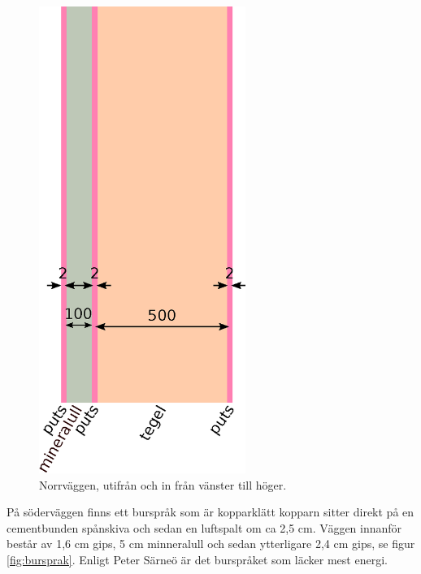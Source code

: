 \begin{figure}[hpbt]
\centering
\includegraphics[width=0.6\textwidth]{../images/norrvagg.eps}
\caption{\label{fig:sodervagg}{Norrväggen, utifrån och in från vänster till höger.}}
\end{figure}

På söderväggen finns ett burspråk som är kopparklätt kopparn sitter direkt på en cementbunden spånskiva och sedan en luftspalt om ca 2,5 cm. Väggen innanför består av 1,6 cm gips, 5 cm minneralull och sedan ytterligare 2,4 cm gips, se figur \ref{fig:bursprak}.\cite{kandidatarbete2010} Enligt Peter Särneö\cite{petersarneo} är det burspråket som läcker mest energi.

